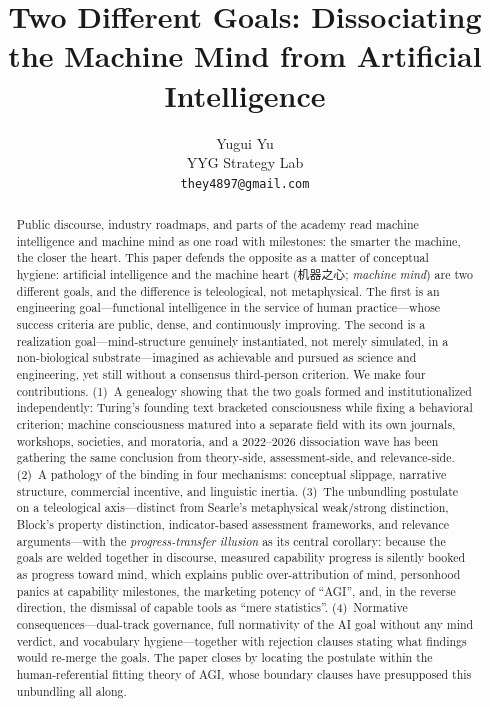 \documentclass[10pt]{article}
\title{Two Different Goals: Dissociating the Machine Mind from Artificial Intelligence}
\author{Yugui Yu\\ YYG Strategy Lab\\ \texttt{they4897@gmail.com}}
\date{}
\begin{document}
\maketitle

\begin{abstract}
\noindent Public discourse, industry roadmaps, and parts of the academy read machine intelligence and machine mind as one road with milestones: the smarter the machine, the closer the heart. This paper defends the opposite as a matter of conceptual hygiene: artificial intelligence and the machine heart (机器之心; \emph{machine mind}) are two different goals, and the difference is teleological, not metaphysical. The first is an engineering goal---functional intelligence in the service of human practice---whose success criteria are public, dense, and continuously improving. The second is a realization goal---mind-structure genuinely instantiated, not merely simulated, in a non-biological substrate---imagined as achievable and pursued as science and engineering, yet still without a consensus third-person criterion. We make four contributions. (1)~A genealogy showing that the two goals formed and institutionalized independently: Turing's founding text bracketed consciousness while fixing a behavioral criterion; machine consciousness matured into a separate field with its own journals, workshops, societies, and moratoria, and a 2022--2026 dissociation wave has been gathering the same conclusion from theory-side, assessment-side, and relevance-side. (2)~A pathology of the binding in four mechanisms: conceptual slippage, narrative structure, commercial incentive, and linguistic inertia. (3)~The unbundling postulate on a teleological axis---distinct from Searle's metaphysical weak/strong distinction, Block's property distinction, indicator-based assessment frameworks, and relevance arguments---with the \emph{progress-transfer illusion} as its central corollary: because the goals are welded together in discourse, measured capability progress is silently booked as progress toward mind, which explains public over-attribution of mind, personhood panics at capability milestones, the marketing potency of ``AGI'', and, in the reverse direction, the dismissal of capable tools as ``mere statistics''. (4)~Normative consequences---dual-track governance, full normativity of the AI goal without any mind verdict, and vocabulary hygiene---together with rejection clauses stating what findings would re-merge the goals. The paper closes by locating the postulate within the human-referential fitting theory of AGI, whose boundary clauses have presupposed this unbundling all along.
\end{abstract}
\end{document}
